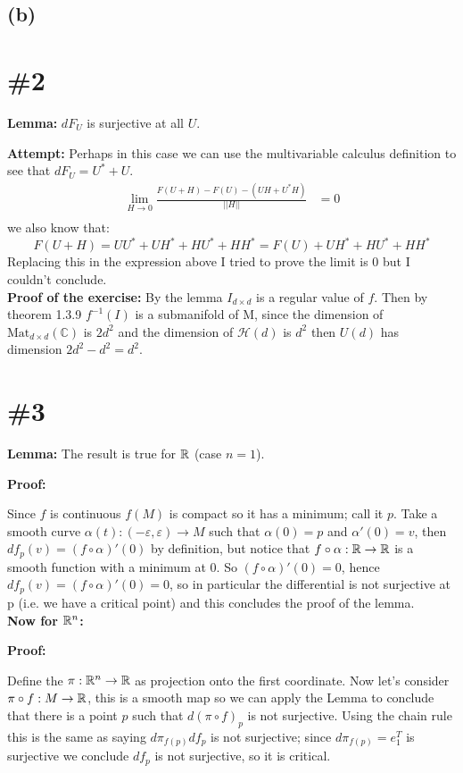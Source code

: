 \documentclass{article}
\begin{document}
\subsection*{(b)}

\section*{\#2}
\textbf{Lemma:} $dF_U$ is surjective at all $U$.

\textbf{Attempt:}
Perhaps in this case we can use the multivariable calculus definition to see
that $dF_U=U^*+U$.
\begin{align*}
\lim_{H\to0}\frac{F(U+H)-F(U)-(UH+U^*H)}{||H||}
&=0\\
\end{align*}
we also know that:
\[
F(U+H)=UU^*+UH^*+HU^*+HH^*=F(U)+UH^*+HU^*+HH^*
\]
Replacing this in the expression above I tried to prove the limit is 0 but I
couldn't conclude.\\
\textbf{Proof of the exercise:}
By the lemma $I_{d\times d}$ is a regular value of $f$. Then by theorem 1.3.9
$f^{-1}(I)$ is a submanifold of M, since the dimension of $\text{Mat}_{d\times d}(\mathbb{C})$ is $2d^2$ and the dimension of $\mathcal{H}(d)$ is $d^2$ then $U(d)$ has dimension $2d^2-d^2=d^2$.
\section*{\#3}
\textbf{Lemma:} The result is true for $\mathbb{R}$ (case $n=1$).

\textbf{Proof:}

	Since $f$ is continuous $f(M)$ is compact so
	it has a minimum; call it $p$. Take a smooth
	curve
	$\alpha(t):(-\varepsilon,\varepsilon)\to M$
	such that $\alpha(0)=p$ and $\alpha'(0)=v$,
	then $df_p(v)=(f\circ \alpha)'(0)$ by
	definition, but notice that $f\circ\alpha:\mathbb{R}
	\to\mathbb{R}$ is a smooth function with a minimum at
	0. So $(f\circ \alpha)'(0)=0$, hence
	$df_p(v)=(f\circ \alpha)'(0)=0$, so in
	particular the differential is not surjective
	at p (i.e. we have a critical point) and this
	concludes the proof of the lemma.\\
	\textbf{Now for $\mathbb{R}^n$:}

\textbf{Proof:}

	Define the $\pi:\mathbb{R}^n\to\mathbb{R}$ as projection onto
	the first coordinate. Now let's consider
	$\pi\circ f:M\to\mathbb{R}$, this is a smooth map so
	we can apply the Lemma to conclude that there
	is a point $p$ such that $d(\pi\circ f)_p$ is
	not surjective. Using the chain rule this is
	the same as saying $d\pi_{f(p)}df_p$ is not
	surjective; since $d\pi_{f(p)}=e_1^T$ is
	surjective we conclude $df_p$ is not
	surjective, so it is critical.
\end{document}
